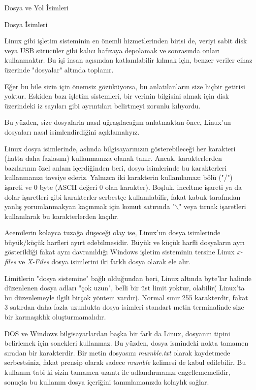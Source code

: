 \begin{section}{Dosya ve Yol İsimleri}
\begin{subsection}{Dosya İsimleri}

Linux gibi işletim sisteminin en önemli hizmetlerinden birisi de, veriyi sabit disk veya USB sürücüler gibi kalıcı hafızaya depolamak ve sonrasında onları kullanmaktır. Bu işi insan açısından katlanılabilir kılmak için, benzer veriler cihaz üzerinde "dosyalar" altında toplanır.

Eğer bu bile sizin için önemsiz gözüküyorsa, bu anlatılanların size hiçbir getirisi yoktur. Eskiden bazı işletim sistemleri, bir verinin bilgisini almak için disk üzerindeki iz sayıları gibi ayrıntıları belirtmeyi zorunlu kılıyordu. 

Bu yüzden, size dosyalarla nasıl uğraşılacağını anlatmaktan önce, Linux'un dosyaları nasıl isimlendirdiğini açıklamalıyız.

Linux dosya isimlerinde, aslında bilgisayarınızın gösterebileceği her karakteri (hatta daha fazlasını) kullanmanıza olanak tanır. Ancak, karakterlerden bazılarının özel anlam içerdiğinden beri, dosya isimlerinde bu karakterleri kullanmanızı tavsiye ederiz. Yalnızca iki karakterin kullanılamaz: bölü ("/") işareti ve 0 byte (ASCII değeri 0 olan karakter). Boşluk, inceltme işareti ya da dolar işaretleri gibi karakterler serbestçe kullanılabilir, fakat kabuk tarafından yanlış yorumlanmakyan kaçınmak için komut satırında "$\backslash$" veya tırnak işaretleri kullanılarak bu karakterlerden kaçılır.

Acemilerin kolayca tuzağa düşeceği olay ise, Linux'un dosya isimlerinde büyük/küçük harfleri ayırt edebilmesidir. Büyük ve küçük harfli dosyaların ayrı gösterildiği fakat aynı davranıldığı Windows işletim sisteminin tersine Linux \emph{x-files} ve \emph{X-Files} dosya isimlerini iki farklı dosya olarak ele alır.

Limitlerin "dosya sistemine" bağlı olduğundan beri, Linux altında byte'lar halinde düzenlenen dosya adları "çok uzun", belli bir üst limit yoktur, olabilir( Linux'ta  bu düzenlemeyle ilgili birçok yöntem vardır). Normal sınır 255 karakterdir, fakat 3 satırdan daha fazla uzunlukta dosya isimleri standart metin terminalinde size bir karmaşıklık oluşturmamalıdır.
	
DOS ve Windows bilgisayarlardan başka bir fark da Linux, dosyanın tipini belirlemek için sonekleri kullanmaz. Bu yüzden, dosya ismindeki nokta tamamen sıradan bir karakterdir. Bir metin dosyasını \emph{mumble.txt} olarak kaydetmede serbestsiniz, fakat prensip olarak sadece \emph{mumble} kelimesi de  kabul edilebilir. Bu kullanım tabi ki sizin tamamen uzantı ile adlandırmanızı engellememelidir, sonuçta bu kullanım dosya içeriğini tanımlamanızda kolaylık sağlar.
	

\end{subsection}
\end{section}
